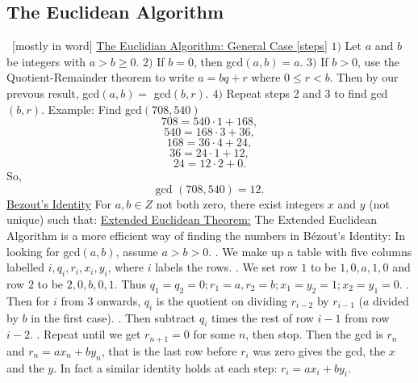 \documentclass{article}
\begin{document}
\subsection{The Euclidean Algorithm}
\
[mostly in word]
\newline
\newline
{}
\newline
\newline
\underline{The Euclidian Algorithm: General Case [steps]}
\newline
\newline
$1)$	Let $a$ and $b$ be integers with $a > b \geq 0.$
\newline
$2)$	If $b = 0$, then gcd$(a,b) = a.$
\newline
$3)$	If $b > 0$, use the Quotient-Remainder theorem to write $a = bq + r$ where $0 \leq r < b$.	Then by our prevous result, gcd$(a,b) =$ gcd$(b,r).$
\newline
$4)$	Repeat steps 2 and 3 to find gcd$(b,r)$.
\newline
\newline
Example: Find gcd$(708, 540)$
$$708 = 540 \cdot 1 + 168,$$
$$540 = 168 \cdot 3 + 36,$$
$$168 = 36 \cdot 4 + 24,$$
$$36 = 24 \cdot 1 + 12,$$ 
$$24 = 12 \cdot 2 + 0.$$
So,
$$\text{gcd }(708,540) = 12.$$
\newline
\newline
\underline{Bezout's Identity}
\newline
\newline
For $a,b \in Z$ not both zero, there exist integers $x$ and $y$ (not unique) such that:
\newline
\newline
{}
\newline
\newline
{}
\newline
\newline
\underline{Extended Euclidean Theorem:}
The Extended Euclidean Algorithm is a more efficient way of finding the numbers in Bézout's Identity: In looking for gcd$(a,b)$, assume $a > b > 0$.
. We make up a table with five columns labelled $i, q_i, r_i, x_i, y_i$, where $i$ labels the rows.
. We set row $1$ to be $1,0,a,1,0$ and row $2$ to be $2,0,b,0,1.$
Thus $q_1 = q_2 = 0; r_1 = a, r_2 = b; x_1 = y_2 = 1; x_2 = y_1 = 0.$
. Then for $i$ from $3$ onwards, $q_i$ is the quotient on dividing $r_{i-2}$ by $r_{i-1}$ ($a$ divided by $b$ in the first case).
. Then subtract $q_i$ times the rest of row $i - 1$ from row $i - 2$.
. Repeat until we get $r_{n+1} = 0$ for some $n$, then stop.
Then the gcd is $r_n$ and $r_n = ax_n + by_n$, that is the last row before $r_i$ was zero gives the gcd, the $x$ and the $y$.
\newline
In fact a similar identity holds at each step: $r_i = ax_i + by_i$.
\newpage
\end{document}

